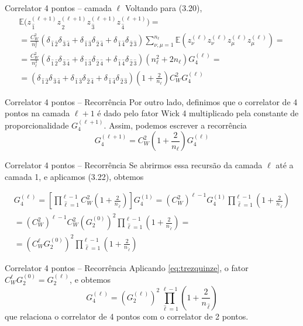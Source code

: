 \documentclass{beamer}
\newcommand{\EE}{\mathbb{E}}
\def\mi#1{{\,\widehat{#1}}}
\def\eell{{(\ell)}}
\def\eellum{{(\ell+1)}}
\def\wickquatro{\delta_{\mi1\mi2}\delta_{\mi3\mi4} + \delta_{\mi1\mi3}\delta_{\mi2\mi4}+  \delta_{\mi1\mi4}\delta_{\mi2\mi3}}
\begin{document}
\begin{frame}{Correlator 4 pontos -- camada $\ell$}
	Voltando para (3.20),\small
	\begin{multline*}
		\EE\big(z^\eellum_{\mi1} z^\eellum_{\mi2} z^\eellum_{\mi3} z^\eellum_{\mi4}\big) = \\
		= \frac{C_W^2}{n_\ell^2}\left(\wickquatro \right)\sum_{\nu,\mu=1}^{n_\ell} \EE\left( z^\eell_{\nu}z^\eell_{\nu} z^\eell_{\mu}z^\eell_{\mu}\right)= \\
		= \frac{C_W^2}{n_\ell^2}\left(\wickquatro \right)\left(n_\ell^2 + 2n_\ell\right)G^\eell_4 = \\
		= \left(\wickquatro \right) \left(1 + \frac{2}{n_\ell}\right)C_W^2 G^\eell_4
	\end{multline*}
\end{frame}

\begin{frame}{Correlator 4 pontos -- Recorrência}
	Por outro lado, definimos que o correlator de 4 pontos na camada $\ell+1$ é dado pelo fator Wick 4 multiplicado pela constante de proporcionalidade $G_4^\eellum$. Assim, podemos escrever a recorrência
	\begin{equation*}\tag{3.24}
		G_4^{(\ell+1)} = {C_W^2}\left(1 + \frac{2}{n_\ell}\right)G_4^{(\ell)}
	\end{equation*}
\end{frame}

\begin{frame}{Correlator 4 pontos -- Recorrência}
	Se abrirmos essa recursão da camada $\ell$ até a camada 1, e aplicamos (3.22), obtemos

	\begin{multline*}
		G_4^\eell\! =\! \left[\prod_{\mi{\ell}=1}^{\ell-1}C_W^2\left(1 + \frac{2}{n_{\mi{\ell}}}\right)\right]\!G_4^{(1)} 
		= \left(C_W^2\right)^{\ell-1}G_4^{(1)}\prod_{\mi{\ell}=1}^{\ell-1}\left(1 + \frac{2}{n_{\mi{\ell}}}\right) \\ = \left(C_W^2\right)^{\ell-1}C_W^2\left(G_2^{(0)}\right)^2\prod_{\mi{\ell}=1}^{\ell-1}\left(1 + \frac{2}{n_{\mi{\ell}}}\right)  = \\=  \left(C_W^{\ell}G_2^{(0)}\right)^2\prod_{\mi{\ell}=1}^{\ell-1}\left(1 + \frac{2}{n_{\mi{\ell}}}\right)
	\end{multline*} 
\end{frame}

\begin{frame}{Correlator 4 pontos -- Recorrência}
	Aplicando \eqref{eq:trezquinze}, o fator $C_W^{\ell}G_2^{(0)} = G_2^\eell$, e obtemos
	\begin{equation*}\tag{3.25}
		G_4^\eell = \left(G_2^\eell\right)^2\prod_{\mi{\ell}=1}^{\ell-1}\left(1 + \frac{2}{n_{\mi{\ell}}}\right)
	\end{equation*}
	que relaciona o correlator de 4 pontos com o correlator de 2 pontos.

\end{frame}
\end{document}
